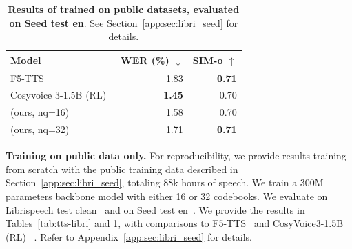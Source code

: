 \documentclass{article}
\begin{document}
\begin{table}
\centering
\caption{\textbf{Results of \oursTTS{} trained on public datasets, evaluated on LibriSpeech test-clean}. We compare to F5-TTS~\citep{chen2024f5}, following their evaluation framework. RTF and Throughput were computed on a H100 for both methods.}
\label{tab:tts-libri}
\end{table}

\begin{table}[t]
\centering
\caption{\textbf{Results of \oursTTS{} trained on public datasets, evaluated on Seed test en}. See Section~\ref{app:sec:libri_seed} for details.}
\label{tab:tts-seed}
\begin{tabular}{l|rr}
\toprule
\textbf{Model} 
& \textbf{WER} (\%) $\downarrow$ & \textbf{SIM-o} $\uparrow$
\\
\midrule
F5-TTS~\citep{chen2024f5}  & 1.83 & \textbf{0.71} \\
Cosyvoice 3-1.5B (RL)~\citep{du2025cosyvoice}  & \textbf{1.45} & 0.70 \\
\oursTTS{} (ours, nq=16) & 1.58 & 0.70 \\
\oursTTS{} (ours, nq=32) & 1.71 & \textbf{0.71} \\
\bottomrule
\end{tabular}
\end{table}

\textbf{Training on public data only.}
For reproducibility, we provide results training from scratch \oursTTS{} with the public training data described in Section~\ref{app:sec:libri_seed}, totaling 88k hours of speech.
We train a 300M parameters backbone model with either 16 or 32 codebooks. We evaluate
on Librispeech test clean~\citep{librispeech} and on Seed test en~\citep{anastassiou2024seed}. We provide the results in Tables~\ref{tab:tts-libri} and \ref{tab:tts-seed}, with comparisons to F5-TTS~\citep{chen2024f5} and CosyVoice3-1.5B (RL) ~\citep{du2025cosyvoice}.
Refer to Appendix~\ref{app:sec:libri_seed} for details.
\end{document}
